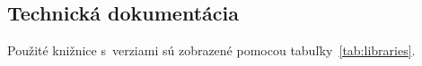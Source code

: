 \documentclass[a4paper,twoside,slovak,12pt,appendix]{article}
\begin{document}

\newpage\null\thispagestyle{empty}\newpage
{}


\newpage\null\thispagestyle{empty}\newpage


\begin{appendices}
\newpage
{}

\section{Technická dokumentácia}
Použité knižnice s~verziami sú zobrazené pomocou tabuľky~\ref{tab:libraries}.


\end{appendices}
\end{document}
